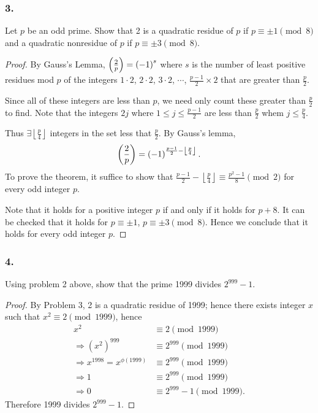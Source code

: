 \subsubsection{3.} Let $p$ be an odd prime. Show that 2 is a quadratic residue
of $p$ if $p \equiv \pm 1 \pmod{8}$ and a quadratic nonresidue of $p$ if
$p \equiv \pm 3 \pmod{8}$.

\begin{proof}
    By Gauss's Lemma, $\left(\frac{2}{p}\right)=\left(-1\right)^s$
    where $s$ is the number of least positive residues mod $p$ of the integers $1\cdot 2$,
    $2 \cdot 2$, $3 \cdot 2$, $\cdots$, $\frac{p-1}{2}\times 2$ that are greater than $\frac{p}{2}$.  
    
    Since all of these integers are less than $p$, we need only count these greater than $\frac{p}{2}$ to find.
    Note that the integers $2j$ where $1\leq j\leq \frac{p-1}{2}$ are less than $\frac{p}{2}$ whem
    $j \leq \frac{p}{4}$.

    Thus $\exists \left\lfloor\frac{p}{4}\right\rfloor$ integers in the set less
    that $\frac{p}{2}$. By Gauss's lemma,
    \[
        \left(\frac{2}{p}\right) = \left(-1\right)^{\frac{p-1}{2} - \left\lfloor\frac{p}{4}\right\rfloor}.
    \]
    To prove the theorem, it suffice to show that $\frac{p-1}{2} - \left\lfloor\frac{p}{4}\right\rfloor \equiv \frac{p^2-1}{8} \pmod{2}$
    for every odd integer $p$.

    Note that it holds for a positive integer $p$ if and only if it holds for $p+8$.
    It can be checked that it holds for $p\equiv\pm 1$, $p\equiv\pm 3 \pmod{8}$.
    Hence we conclude that it holds for every odd integer $p$.
\end{proof}

\subsubsection{4.} Using problem 2 above, show that the prime 1999
divides $2^{999}-1$.

\begin{proof}
    By Problem 3, 2 is a quadratic residue of 1999; hence there exists integer $x$
    such that $x^2 \equiv 2 \pmod{1999}$, hence
    \begin{align*}
        x^2 &\equiv 2 \pmod{1999} \\
        \Rightarrow \left(x^2\right)^{999} &\equiv 2^{999} \pmod{1999} \\
        \Rightarrow x^{1998} = x^{\phi\left(1999\right)} &\equiv 2^{999} \pmod{1999} \\
        \Rightarrow 1 &\equiv 2^{999} \pmod{1999} \\
        \Rightarrow 0 &\equiv 2^{999}-1 \pmod{1999}.
    \end{align*}
    Therefore 1999 divides $2^{999}-1$.
\end{proof}


